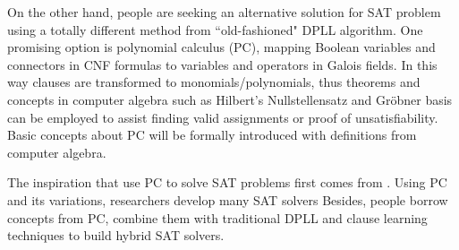On the other hand, people are seeking an alternative solution for SAT problem using a totally
different method from ``old-fashioned" DPLL algorithm. One promising option is polynomial calculus (PC),
mapping Boolean variables and connectors in CNF formulas to variables and operators in 
Galois fields. In this way clauses are transformed to monomials/polynomials, thus theorems and concepts in computer
algebra such as Hilbert's Nullstellensatz and Gr\"obner basis can be employed to assist finding
valid assignments or proof of unsatisfiability. Basic concepts about PC will be formally introduced with definitions
from computer algebra.

The inspiration that use PC to solve SAT problems first comes from \cite{ceiSTOC96}.
Using PC and its variations, researchers develop many SAT solvers \cite{STABLE} \cite{BLUEVERI} \cite{PolyBoRi} 
Besides, people borrow concepts from PC, combine them with traditional DPLL and clause learning techniques
to build hybrid SAT solvers. \cite{condratTACAS07} \cite{Zengler2010}
